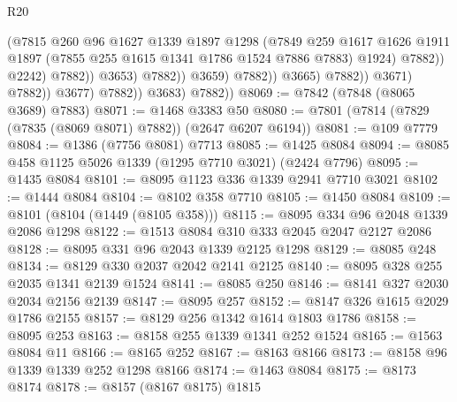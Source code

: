 \begin{lexlean}{R20}
\begin{coremodule}
                                                (@7815
                                                  @260
                                                  @96
                                                  @1627
                                                  @1339
                                                  @1897
                                                  @1298
                                                  (@7849
                                                    @259
                                                    @1617
                                                    @1626
                                                    @1911
                                                    @1897
                                                    (@7855 @255 @1615 @1341 @1786 @1524 @7886 @7883)
                                                    @1924)
                                                  @7882))
                                              @2242)
                                            @7882))
                                        @3653)
                                      @7882))
                                  @3659)
                                @7882))
                            @3665)
                          @7882))
                      @3671)
                    @7882))
                @3677)
              @7882))
          @3683)
        @7882))
@8069 := @7842 (@7848 (@8065 @3689) @7883)
@8071 := @1468 @3383 @50
@8080 := @7801 (@7814 (@7829 (@7835 (@8069 @8071) @7882)) (@2647 @6207 @6194))
@8081 := @109 @7779
@8084 := @1386 (@7756 @8081) @7713
@8085 := @1425 @8084
@8094 := @8085 @458 @1125 @5026 @1339 (@1295 @7710 @3021) (@2424 @7796)
@8095 := @1435 @8084
@8101 := @8095 @1123 @336 @1339 @2941 @7710 @3021
@8102 := @1444 @8084
@8104 := @8102 @358 @7710
@8105 := @1450 @8084
@8109 := @8101 (@8104 (@1449 (@8105 @358)))
@8115 := @8095 @334 @96 @2048 @1339 @2086 @1298
@8122 := @1513 @8084 @310 @333 @2045 @2047 @2127 @2086
@8128 := @8095 @331 @96 @2043 @1339 @2125 @1298
@8129 := @8085 @248
@8134 := @8129 @330 @2037 @2042 @2141 @2125
@8140 := @8095 @328 @255 @2035 @1341 @2139 @1524
@8141 := @8085 @250
@8146 := @8141 @327 @2030 @2034 @2156 @2139
@8147 := @8095 @257
@8152 := @8147 @326 @1615 @2029 @1786 @2155
@8157 := @8129 @256 @1342 @1614 @1803 @1786
@8158 := @8095 @253
@8163 := @8158 @255 @1339 @1341 @252 @1524
@8165 := @1563 @8084 @11
@8166 := @8165 @252
@8167 := @8163 @8166
@8173 := @8158 @96 @1339 @1339 @252 @1298 @8166
@8174 := @1463 @8084
@8175 := @8173 @8174
@8178 := @8157 (@8167 @8175) @1815

\end{coremodule}
\end{lexlean}
